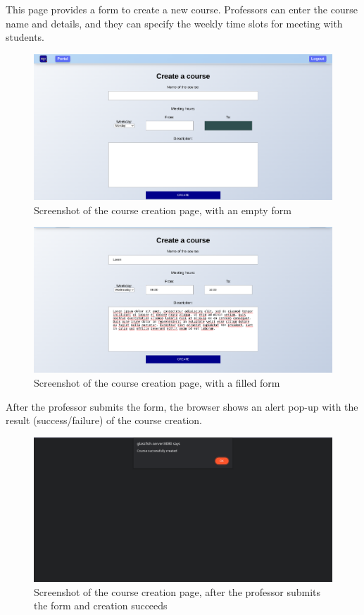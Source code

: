 This page provides a form to create a new course.
Professors can enter the course name and details, and they can specify the weekly time slots for meeting with students.

\begin{figure}[H]
    \centering
    \includegraphics[width=\textwidth]{img/user_manual/professor/create-course-1.png}
    \caption{Screenshot of the course creation page, with an empty form}
\end{figure}

\begin{figure}[H]
    \centering
    \includegraphics[width=\textwidth]{img/user_manual/professor/create-course-2.png}
    \caption{Screenshot of the course creation page, with a filled form}
\end{figure}

After the professor submits the form, the browser shows an alert pop-up with the result (success/failure) of the course creation.

\begin{figure}[H]
    \centering
    \includegraphics[width=\textwidth]{img/user_manual/professor/create-course-3.png}
    \caption{Screenshot of the course creation page, after the professor submits the form and creation succeeds}
\end{figure}

